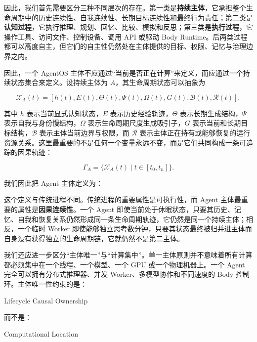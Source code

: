 因此，我们首先需要区分三种不同层次的存在。第一类是\textbf{持续主体}，它承担整个生命周期中的历史连续性、自我连续性、长期目标连续性和最终行为责任；第二类是\textbf{认知过程}，它执行推理、规划、回忆、比较、模拟和反思；第三类是\textbf{执行过程}，它操作工具、访问文件、控制设备、调用 API 或驱动 Body Runtime。后两类过程都可以高度自主，但它们的自主性仍然处在主体提供的目标、权限、记忆与治理边界之内。

因此，一个 AgentOS 主体不应通过“当前是否正在计算”来定义，而应通过一个持续状态集合来定义。设持续主体为 $A$，其生命周期状态可以抽象为

\[
\mathcal{X}_A(t)
=
\left[
h(t),
E(t),
\Theta(t),
\Psi(t),
\Omega(t),
G(t),
\mathcal{B}(t),
\mathcal{R}(t)
\right],
\]

其中 $h$ 表示当前显式认知状态，$E$ 表示历史经验轨迹，$\Theta$ 表示长期生成结构，$\Psi$ 表示自我与身份慢结构，$\Omega$ 表示生命周期尺度生成吸引子，$G$ 表示当前和长期目标结构，$\mathcal{B}$ 表示主体当前边界与权限，而 $\mathcal{R}$ 表示主体正在持有或能够恢复的运行资源关系。这里最重要的不是任何一个变量永远不变，而是它们共同构成一条可追踪的因果轨迹：

\[
\Gamma_A
=
\{
\mathcal{X}_A(t)
\mid
t\in[t_0,t_n]
\}.
\]

我们因此把 Agent 主体定义为：

\begin{statementbox}
\centering
{}
\end{statementbox}

这个定义与传统进程不同。传统进程的重要属性是可执行性，而 Agent 主体最重要的属性是\textbf{因果连续性}。一个 Agent 即使当前处于休眠状态，只要其历史、记忆、自我和恢复关系仍然形成同一条生命周期轨迹，它仍然是同一个持续主体；相反，一个临时 Worker 即使能够独立思考数分钟，只要其状态最终被归并进主体而自身没有获得独立的生命周期链，它就仍然不是第二主体。

我们还应进一步区分“主体唯一”与“计算集中”。单一主体原则并不意味着所有计算都必须集中在一个线程、一个模型、一个 GPU 或一个物理机器上。一个 Agent 完全可以拥有分布式推理器、并发 Worker、多模型协作和不同速度的 Body 控制环。主体唯一性约束的是：

\begin{proposition*}
Lifecycle Causal Ownership
\end{proposition*}

而不是：

\begin{statementbox}
Computational Location
\end{statementbox}

